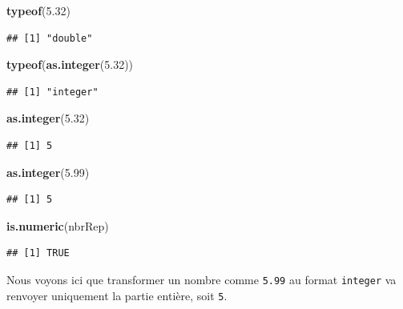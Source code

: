 \documentclass[
]{book}
\newenvironment{Shaded}{\begin{snugshade}}{\end{snugshade}}
\newcommand{\FloatTok}[1]{\textcolor[rgb]{0.00,0.00,0.81}{#1}}
\newcommand{\KeywordTok}[1]{\textcolor[rgb]{0.13,0.29,0.53}{\textbf{#1}}}
\newcommand{\NormalTok}[1]{#1}
\begin{document}
\begin{Shaded}
\begin{Highlighting}[]
\KeywordTok{typeof}\NormalTok{(}\FloatTok{5.32}\NormalTok{)}
\end{Highlighting}
\end{Shaded}

\begin{verbatim}
## [1] "double"
\end{verbatim}

\begin{Shaded}
\begin{Highlighting}[]
\KeywordTok{typeof}\NormalTok{(}\KeywordTok{as.integer}\NormalTok{(}\FloatTok{5.32}\NormalTok{))}
\end{Highlighting}
\end{Shaded}

\begin{verbatim}
## [1] "integer"
\end{verbatim}

\begin{Shaded}
\begin{Highlighting}[]
\KeywordTok{as.integer}\NormalTok{(}\FloatTok{5.32}\NormalTok{)}
\end{Highlighting}
\end{Shaded}

\begin{verbatim}
## [1] 5
\end{verbatim}

\begin{Shaded}
\begin{Highlighting}[]
\KeywordTok{as.integer}\NormalTok{(}\FloatTok{5.99}\NormalTok{)}
\end{Highlighting}
\end{Shaded}

\begin{verbatim}
## [1] 5
\end{verbatim}

\begin{Shaded}
\begin{Highlighting}[]
\KeywordTok{is.numeric}\NormalTok{(nbrRep)}
\end{Highlighting}
\end{Shaded}

\begin{verbatim}
## [1] TRUE
\end{verbatim}

Nous voyons ici que transformer un nombre comme \texttt{5.99} au format \texttt{integer} va renvoyer uniquement la partie entière, soit \texttt{5}.
\end{document}
